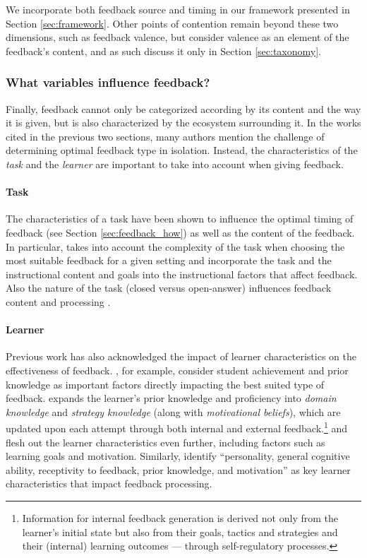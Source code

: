 We incorporate both feedback source and timing in our framework presented in Section 
\ref{sec:framework}. Other points of contention remain beyond these two dimensions, such as feedback valence, but consider valence as an element of the feedback's content, and as such discuss it only in Section \ref{sec:taxonomy}.

\subsubsection{What variables influence feedback?}
Finally, feedback cannot only be categorized according by its content and the way it is given, but is also characterized by the ecosystem surrounding it. In the works cited in the previous two sections, many authors mention the challenge of determining optimal feedback type in isolation. Instead, the characteristics of the \textit{task} and the \textit{learner} are important to take into account when giving feedback.

\paragraph{Task} The characteristics of a task have been shown to influence the optimal timing of feedback (see Section \ref{sec:feedback_how}) as well as the content of the feedback.  In particular, \citet{mason_providing_2001} takes into account the complexity of the task when choosing the most suitable feedback for a given setting and \citet{narciss_how_2004, narciss_feedback_2008} incorporate the task and the instructional content and goals into the instructional factors that affect feedback. Also the nature of the task (\eg closed versus open-answer) influences feedback content and processing \cite{lipnevich_review_2021}.

\paragraph{Learner} Previous work has also acknowledged the impact of learner characteristics on the effectiveness of feedback. 
\citet{mason_providing_2001}, for example, consider student achievement and prior knowledge as important factors directly impacting the best suited type of feedback. \citet{nicol_formative_2006} expands the learner's prior knowledge and proficiency into \textit{domain knowledge} and \textit{strategy knowledge} (along with \textit{motivational beliefs}), which are updated upon each attempt through both internal and external feedback.\footnote{Information for internal feedback generation is derived not only from the learner's initial state but also from their goals, tactics and strategies and their (internal) learning outcomes --- through self-regulatory processes.}
\citet{narciss_how_2004} and \citet{narciss_feedback_2008} flesh out the learner characteristics even further, including factors such as learning goals and motivation. Similarly, \citet{anastasiya_a_lipnevich_david_a_g_berg_jeffrey_k_smith_toward_2016} identify ``personality, general cognitive ability, receptivity to feedback, prior knowledge, and motivation'' as key learner characteristics that impact feedback processing.

